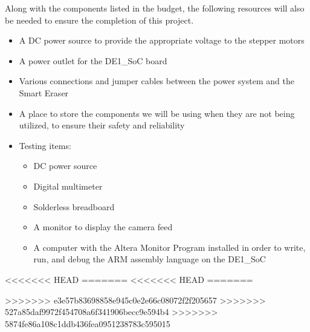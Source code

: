Along with the components listed in the budget, the following resources will also be needed to ensure the completion of this project.
\begin{itemize}
	\item A DC power source to provide the appropriate voltage to the stepper motors
	\item A power outlet for the DE1\_SoC board
	\item Various connections and jumper cables between the power system and the Smart Eraser
	\item A place to store the components we will be using when they are not being utilized, to ensure their safety and reliability
	\item Testing items:
	\begin{itemize}
		\item DC power source
		\item Digital multimeter
		\item Solderless breadboard
		\item A monitor to display the camera feed
		\item A computer with the Altera Monitor Program installed in order to write, run, and debug the ARM assembly language on the DE1\_SoC
	\end{itemize}
\end{itemize}

<<<<<<< HEAD
=======
\pagebreak
<<<<<<< HEAD
=======

>>>>>>> e3e57b83698858e945c0e2e66c08072f2f205657
>>>>>>> 527a85daf9972f454708a6f341906becc9e594b4
>>>>>>> 5874fe86a108c1ddb436fea0951238783c595015

